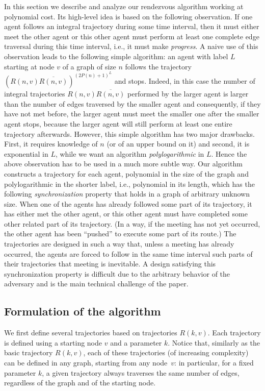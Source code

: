 \documentclass [11pt] {article}
\begin{document}
In this section we describe and analyze our rendezvous algorithm working at polynomial cost. Its high-level idea is based on the following observation.
If one agent follows an integral trajectory during some time interval, then it must either meet the other agent or this other agent must perform at least one complete edge traversal during this time
interval, i.e., it must make {\em progress}.  
A naive use of this observation leads to the following simple algorithm: an agent with label $L$ starting at node $v$ of a graph of size $n$ follows the trajectory $(R(n,v)\overline{R(n,v)})^{(2P(n)+1)^L}$
and stops.
Indeed, in this case the number of integral trajectories $R(n,v)\overline{R(n,v)}$ performed by the larger agent is larger than the number of edges traversed by the smaller agent and consequently, if they have not met before,  the larger agent must meet the smaller one after the smaller agent stops, because the larger agent will still perform at least one entire trajectory afterwards.
However,  this simple algorithm has two major drawbacks.
First, it requires knowledge of $n$ (or of an upper bound on it) and second, it is exponential in $L$, while we want an algorithm {\em polylogarithmic} in $L$. Hence the above observation has to be used in a much more subtle way. Our algorithm constructs a trajectory for each agent, polynomial in the size of the graph and polylogarithmic in the shorter label, i.e., polynomial in its length, which has the following {\em synchronization} property that holds in a graph of arbitrary unknown size. 
When one of the agents has already followed some part of its trajectory, it has either met the other agent, or this other agent must have completed
some other related part of its trajectory. (In a way, if the meeting has not yet occurred, the other agent has been ``pushed'' to execute some part of its route.) The trajectories are designed in such a way
that, unless a meeting has already occurred, the agents are forced to follow in the same time interval such parts of their trajectories that meeting is inevitable. A design satisfying this
synchronization property is difficult due to the arbitrary behavior of the adversary and is the main technical challenge of the paper.

\subsection{Formulation of the algorithm}

We first define several trajectories based on trajectories $R(k,v)$. Each trajectory
is defined using a starting node $v$ and a parameter $k$. Notice that, similarly as the basic trajectory $R(k,v)$, each of these trajectories (of increasing complexity)
can be defined in any graph, starting from any node~$v$: {in particular, for a fixed parameter $k$, a given trajectory always traverses the same number of edges, regardless of the graph and of the starting node}.
\end{document}
